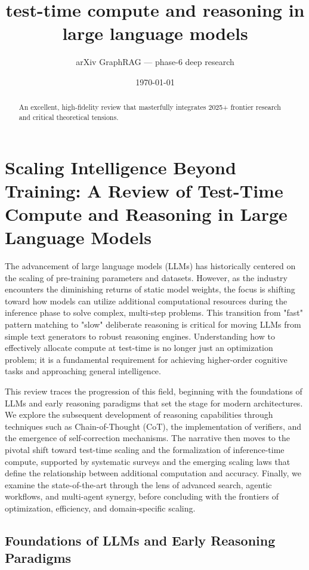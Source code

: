 \documentclass[11pt]{article}
\title{test-time compute and reasoning in large language models}
\author{arXiv GraphRAG --- phase-6 deep research}
\date{\today}
\begin{document}
\maketitle

\begin{abstract}
An excellent, high-fidelity review that masterfully integrates 2025+ frontier research and critical theoretical tensions.
\end{abstract}

\section{Scaling Intelligence Beyond Training: A Review of Test-Time Compute and Reasoning in Large Language Models}

The advancement of large language models (LLMs) has historically centered on the scaling of pre-training parameters and datasets. However, as the industry encounters the diminishing returns of static model weights, the focus is shifting toward how models can utilize additional computational resources during the inference phase to solve complex, multi-step problems. This transition from "fast" pattern matching to "slow" deliberate reasoning is critical for moving LLMs from simple text generators to robust reasoning engines. Understanding how to effectively allocate compute at test-time is no longer just an optimization problem; it is a fundamental requirement for achieving higher-order cognitive tasks and approaching general intelligence.

This review traces the progression of this field, beginning with the foundations of LLMs and early reasoning paradigms that set the stage for modern architectures. We explore the subsequent development of reasoning capabilities through techniques such as Chain-of-Thought (CoT), the implementation of verifiers, and the emergence of self-correction mechanisms. The narrative then moves to the pivotal shift toward test-time scaling and the formalization of inference-time compute, supported by systematic surveys and the emerging scaling laws that define the relationship between additional computation and accuracy. Finally, we examine the state-of-the-art through the lens of advanced search, agentic workflows, and multi-agent synergy, before concluding with the frontiers of optimization, efficiency, and domain-specific scaling.

\subsection{Foundations of LLMs and Early Reasoning Paradigms}
\end{document}
